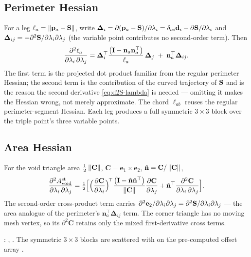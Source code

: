 \documentclass[11pt,a4paper]{article}
\begin{document}
\subsection{Perimeter Hessian}

For a leg $\ell_a = \left\|\mathbf{p}_{a}-\mathbf{S}\right\|$, write
$\boldsymbol{\Delta}_i = \partial(\mathbf{p}_{a}-\mathbf{S})/\partial\lambda_i
= \delta_{ai}\mathbf{d}_{i} - \partial\mathbf{S}/\partial\lambda_i$ and
$\boldsymbol{\Delta}_{ij} = -\partial^2\mathbf{S}/\partial\lambda_i\partial\lambda_j$
(the variable point contributes no second-order term).  Then
\begin{equation}
  \dfrac{\partial^2 \ell_a}{\partial \lambda_i\,\partial \lambda_j}
    = \boldsymbol{\Delta}_i^\top
      \frac{\bigl(\mathbf{I} - \mathbf{n}_a \mathbf{n}_a^\top\bigr)}{\ell_a}\,
      \boldsymbol{\Delta}_j
      \;+\; \mathbf{n}_a^\top\boldsymbol{\Delta}_{ij}.
  \label{eq:d2l}
\end{equation}
The first term is the projected dot product familiar from the regular
perimeter Hessian; the second term is the contribution of the curved
trajectory of $\mathbf{S}$ and is the reason the second derivative
\eqref{eq:d2S-lambda} is needed --- omitting it makes the Hessian wrong, not
merely approximate.  The chord $\ell_{ab}$ reuses the regular
perimeter-segment Hessian.  Each leg produces a full symmetric $3\times3$
block over the triple point's three variable points.

\subsection{Area Hessian}

For the void triangle area $\tfrac12\left\|\mathbf{C}\right\|$,
$\mathbf{C}=\mathbf{e}_1\times\mathbf{e}_2$, $\hat{\mathbf{n}}=\mathbf{C}/\left\|\mathbf{C}\right\|$,
\begin{equation}
  \dfrac{\partial^2 A^{\mathrm{st}}_{\text{void}}}{\partial \lambda_i\,\partial \lambda_j}
    = \tfrac12\Bigl[
        \Bigl(\dfrac{\partial \mathbf{C}}{\partial \lambda_i}\Bigr)^{\!\top}
        \frac{\bigl(\mathbf{I} - \hat{\mathbf{n}} \hat{\mathbf{n}}^\top\bigr)}{\left\|\mathbf{C}\right\|}
        \dfrac{\partial \mathbf{C}}{\partial \lambda_j}
        + \hat{\mathbf{n}}^\top\dfrac{\partial^2 \mathbf{C}}{\partial \lambda_i\,\partial \lambda_j}
      \Bigr].
  \label{eq:d2A}
\end{equation}
The second-order cross-product term carries $\partial^2\mathbf{e}_2/
\partial\lambda_i\partial\lambda_j = \partial^2\mathbf{S}/\partial\lambda_i\partial\lambda_j$ ---
the area analogue of the perimeter's $\mathbf{n}_a^\top\boldsymbol{\Delta}_{ij}$
term.  The corner triangle has no moving mesh vertex, so its
$\partial^2\mathbf{C}$ retains only the mixed first-derivative cross terms.

\begin{tcolorbox}[colback=blue!4!white, colframe=blue!40!black,
                  title={Code: Steiner Hessians}, fontupper=\small]
:
,
.  The
symmetric $3\times3$ blocks are scattered with  on the
pre-computed offset array .
\end{tcolorbox}
\end{document}
